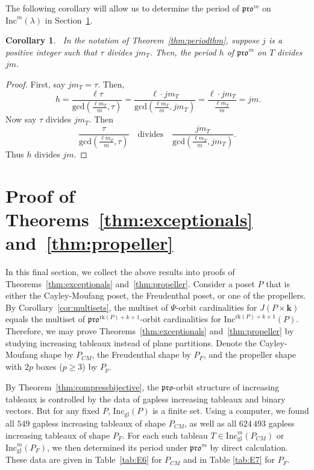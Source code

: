 \documentclass[12pt]{amsart}
\newtheorem{corollary}[theorem]{Corollary}
\theoremstyle{definition}
\theoremstyle{remark}
\numberwithin{equation}{section}
\newcommand{\inc}{\ensuremath{\mathrm{Inc}}}
\newcommand{\incgl}{\inc_{\mathrm{gl}}}
\newcommand{\pro}{\mathfrak{pro}}
\newcommand{\rank}{\ensuremath{\mathrm{rk}}}
\begin{document}
The following corollary will allow us to determine the period of $\pro^m$ on $\inc^m(\lambda)$ in Section~\ref{sec:arithmetic}. 
\\
\begin{corollary}~\label{corr:pdbound}
In the notation of Theorem~\ref{thm:periodthm}, suppose $j$ is a positive integer such that $\tau$ divides $j m_T$. Then, the period $h$ of $\pro^m$ on $T$ divides $j m$. 
\end{corollary} 
\begin{proof}
First, say $j m_T = \tau$. Then,
\begin{equation}~\label{eq:pdbound} h=  \frac{\ell \tau}{\text{gcd}(\frac{\ell m_T}{m},\tau)} = \frac{\ell \cdot j m_T}{\text{gcd}(\frac{\ell m_T}{m},j m_T)} = \frac{\ell \cdot j m_T}{\frac{\ell m_T}{m}} = jm. 
\end{equation}
Now say $\tau$ divides $jm_T$. Then \[ \frac{\tau}{\text{gcd}(\frac{\ell m_T}{m},\tau)} \ \ \  \text{    divides   } \ \ \ \frac{j m_T}{\text{gcd}(\frac{\ell m_T}{m},j m_T)}.\] Thus $h$ divides $j m$. 
\end{proof}

\section{Proof of Theorems~\ref{thm:exceptionals} and~\ref{thm:propeller}}\label{sec:arithmetic}

In this final section, we collect the above results into proofs of Theorems~\ref{thm:exceptionals} and~\ref{thm:propeller}. Consider a poset $P$ that is either the Cayley-Moufang poset, the Freudenthal poset, or one of the propellers. By Corollary~\ref{cor:multisets},  the multiset of $\Psi$-orbit cardinalities for $J(P \times \mathbf{k})$ equals the multiset of $\pro^{\rank(P)+ k+1}$-orbit cardinalities for $\inc^{ \rank(P)+ k+1}(P)$. Therefore, we may prove Theorems~\ref{thm:exceptionals} and~\ref{thm:propeller} by studying increasing tableaux instead of plane partitions. Denote the Cayley-Moufang shape by $P_{CM}$, the Freudenthal shape by $P_F$, and the propeller shape with $2p$ boxes ($p \geq 3$) by $P_p$. 

By Theorem~\ref{thm:compressbijective}, the $\pro$-orbit structure of increasing tableaux is controlled by the data of gapless increasing tableaux and binary vectors. But for any fixed $P$, $\incgl(P)$ is a finite set. Using a computer, we found all $549$ gapless increasing tableaux of shape $P_{CM}$, as well as all $624\, 493$ gapless increasing tableaux of shape $P_F$. For each such tableau $T \in \incgl^m(P_{CM})$ or $\incgl^m(P_F)$, we then determined its period under $\pro^m$ by direct calculation. These data are given in Table~\ref{tab:E6} for $P_{CM}$ and in Table \ref{tab:E7} for $P_F$. 
\end{document}
